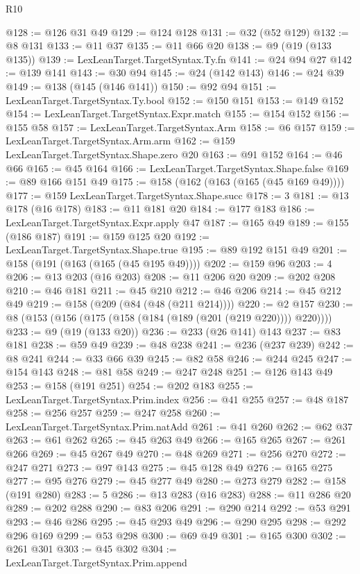 \begin{lexlean}{R10}
\begin{coremodule}
@128 := @126 @31 @49
@129 := @124 @128
@131 := @32 (@52 @129)
@132 := @8 @131
@133 := @11 @37
@135 := @11 @66 @20
@138 := @9 (@19 (@133 @135))
@139 := LexLeanTarget.TargetSyntax.Ty.fn
@141 := @24 @94 @27
@142 := @139 @141
@143 := @30 @94
@145 := @24 (@142 @143)
@146 := @24 @39
@149 := @138 (@145 (@146 @141))
@150 := @92 @94
@151 := LexLeanTarget.TargetSyntax.Ty.bool
@152 := @150 @151
@153 := @149 @152
@154 := LexLeanTarget.TargetSyntax.Expr.match
@155 := @154 @152
@156 := @155 @58
@157 := LexLeanTarget.TargetSyntax.Arm
@158 := @6 @157
@159 := LexLeanTarget.TargetSyntax.Arm.arm
@162 := @159 LexLeanTarget.TargetSyntax.Shape.zero @20
@163 := @91 @152
@164 := @46 @66
@165 := @45 @164
@166 := LexLeanTarget.TargetSyntax.Shape.false
@169 := @89 @166 @151 @49
@175 := @158 (@162 (@163 (@165 (@45 @169 @49))))
@177 := @159 LexLeanTarget.TargetSyntax.Shape.succ
@178 := 3
@181 := @13 @178 (@16 @178)
@183 := @11 @181 @20
@184 := @177 @183
@186 := LexLeanTarget.TargetSyntax.Expr.apply @47
@187 := @165 @49
@189 := @155 (@186 @187)
@191 := @159 @125 @20
@192 := LexLeanTarget.TargetSyntax.Shape.true
@195 := @89 @192 @151 @49
@201 := @158 (@191 (@163 (@165 (@45 @195 @49))))
@202 := @159 @96
@203 := 4
@206 := @13 @203 (@16 @203)
@208 := @11 @206 @20
@209 := @202 @208
@210 := @46 @181
@211 := @45 @210
@212 := @46 @206
@214 := @45 @212 @49
@219 := @158 (@209 (@84 (@48 (@211 @214))))
@220 := @2 @157
@230 := @8 (@153 (@156 (@175 (@158 (@184 (@189 (@201 (@219 @220)))) @220))))
@233 := @9 (@19 (@133 @20))
@236 := @233 (@26 @141) @143
@237 := @83 @181
@238 := @59 @49
@239 := @48 @238
@241 := @236 (@237 @239)
@242 := @8 @241
@244 := @33 @66 @39
@245 := @82 @58
@246 := @244 @245
@247 := @154 @143
@248 := @81 @58
@249 := @247 @248
@251 := @126 @143 @49
@253 := @158 (@191 @251)
@254 := @202 @183
@255 := LexLeanTarget.TargetSyntax.Prim.index
@256 := @41 @255
@257 := @48 @187
@258 := @256 @257
@259 := @247 @258
@260 := LexLeanTarget.TargetSyntax.Prim.natAdd
@261 := @41 @260
@262 := @62 @37
@263 := @61 @262
@265 := @45 @263 @49
@266 := @165 @265
@267 := @261 @266
@269 := @45 @267 @49
@270 := @48 @269
@271 := @256 @270
@272 := @247 @271
@273 := @97 @143
@275 := @45 @128 @49
@276 := @165 @275
@277 := @95 @276
@279 := @45 @277 @49
@280 := @273 @279
@282 := @158 (@191 @280)
@283 := 5
@286 := @13 @283 (@16 @283)
@288 := @11 @286 @20
@289 := @202 @288
@290 := @83 @206
@291 := @290 @214
@292 := @53 @291
@293 := @46 @286
@295 := @45 @293 @49
@296 := @290 @295
@298 := @292 @296 @169
@299 := @53 @298
@300 := @69 @49
@301 := @165 @300
@302 := @261 @301
@303 := @45 @302
@304 := LexLeanTarget.TargetSyntax.Prim.append

\end{coremodule}
\end{lexlean}
